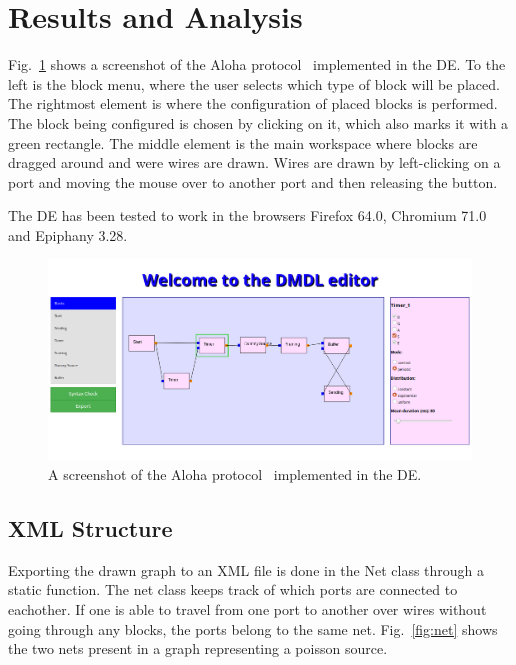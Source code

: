 \documentclass[journal,comsoc]{IEEEtran}
\begin{document}
\section{Results and Analysis}
Fig.~\ref{fig:full_editor} shows a screenshot of the Aloha protocol~\cite{aloha} implemented
in the DE. To the left is the block menu, where the user selects which type of block will be
placed. The rightmost element is where the configuration of placed blocks is performed. The
block being configured is chosen by clicking on it, which also marks it with a green rectangle.
The middle element is the main workspace where blocks are dragged around and were wires are
drawn. Wires are drawn by left-clicking on a port and moving the mouse over to another port and
then releasing the button.

The DE has been tested to work in the browsers Firefox 64.0, Chromium 71.0 and Epiphany 3.28.

\begin{figure}[!t]
    \centering
    \includegraphics[width=\columnwidth]{full_editor.png}
    \caption{A screenshot of the Aloha protocol~\cite{aloha} implemented in the DE.}
    \label{fig:full_editor}
\end{figure}

\subsection{XML Structure}
\label{sec:xml}
Exporting the drawn graph to an XML file is done in the Net class through a static function.
The net class keeps track of which ports are connected to eachother. If one is able to
travel from one port to another over wires without going through any blocks, the ports
belong to the same net. Fig.~\ref{fig:net} shows the two nets present in a graph representing
a poisson source.
\end{document}

